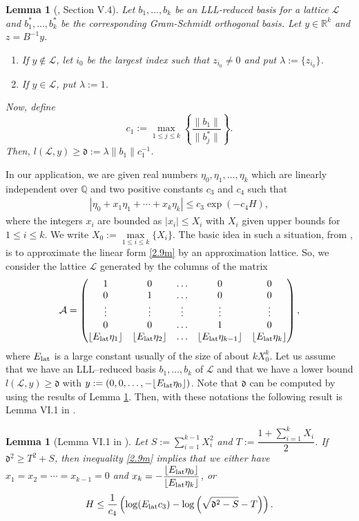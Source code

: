 \documentclass[11pt,a4paper]{article}
\newtheorem{lemma}[theorem]{Lemma}
\numberwithin{equation}{section}
\numberwithin{table}{section}
\numberwithin{figure}{section}
\begin{document}
\begin{lemma}[\cite{SMA}, Section V.4]\label{lem2.5m}
	Let $b_1, \dots, b_k$ be an LLL-reduced basis for a lattice $\mathcal{L}$ and $b_1^*, \dots, b_k^*$ be the corresponding Gram-Schmidt orthogonal basis. Let $y\in\mathbb{R}^k$ and $z=B^{-1}y$.
	\begin{enumerate}[\upshape(i)]
		\item If $y\not \in \mathcal{L}$, let $i_0$ be the largest index such that $z_{i_0}\ne 0$ and put $\lambda:=\{z_{i_0}\}$.
		\item If $y\in \mathcal{L}$, put $\lambda:=1$.
	\end{enumerate}
	Now, define
	\[
	c_1 := \max_{1\le j\le k}\left\{\dfrac{\|b_1\|}{\|b_j^*\|}\right\}.
	\]
	Then, $l(\mathcal{L}, y) \ge  \mathfrak{d} := \lambda\|b_1\|c_1^{-1}$.
\end{lemma}

In our application, we are given real numbers $\eta_0,\eta_1,\ldots,\eta_k$ which are linearly independent over $\mathbb{Q}$ and two positive constants $c_3$ and $c_4$ such that 
\begin{align}\label{2.9m}
	|\eta_0+x_1\eta_1+\cdots +x_k \eta_k|\le c_3 \exp(-c_4 H),
\end{align}
where the integers $x_i$ are bounded as $|x_i|\le X_i$ with $X_i$ given upper bounds for $1\le i\le k$. We write $X_0:=\max\limits_{1\le i\le k}\{X_i\}$. The basic idea in such a situation, from \cite{Weg}, is to approximate the linear form \eqref{2.9m} by an approximation lattice. So, we consider the lattice $\mathcal{L}$ generated by the columns of the matrix
$$ \mathcal{A}=\begin{pmatrix}
	1 & 0 &\ldots& 0 & 0 \\
	0 & 1 &\ldots& 0 & 0 \\
	\vdots & \vdots &\vdots& \vdots & \vdots \\
	0 & 0 &\ldots& 1 & 0 \\
	\lfloor E_{\rm lat}\eta_1\rfloor & \lfloor E_{\rm lat}\eta_2\rfloor&\ldots & \lfloor E_{\rm lat}\eta_{k-1}\rfloor& \lfloor E_{\rm lat}\eta_{k} \rfloor
\end{pmatrix} ,$$
where $E_{\rm lat}$ is a large constant usually of the size of about $kX_0^k$. Let us assume that we have an LLL--reduced basis $b_1,\ldots, b_k$ of $\mathcal{L}$ and that we have a lower bound $l\left(\mathcal{L},y\right)\ge \mathfrak{d}$ with $y:=(0,0,\ldots,-\lfloor E_{\rm lat}\eta_0\rfloor)$. Note that $ \mathfrak{d}$ can be computed by using the results of Lemma \ref{lem2.5m}. Then, with these notations the following result  is Lemma VI.1 in \cite{SMA}.
\begin{lemma}[Lemma VI.1 in \cite{SMA}]\label{lem2.6m}
	Let $S:=\displaystyle\sum_{i=1}^{k-1}X_i^2$ and $T:=\dfrac{1+\sum_{i=1}^{k}X_i}{2}$. If $\mathfrak{d}^2\ge T^2+S$, then inequality \eqref{2.9m} implies that we either have $x_1=x_2=\cdots=x_{k-1}=0$ and $x_k=-\dfrac{\lfloor E_{\rm lat}\eta_0 \rfloor}{\lfloor E_{\rm lat}\eta_k \rfloor}$, or
	\[
	H\le \dfrac{1}{c_4}\left(\log(E_{\rm lat}c_3)-\log\left(\sqrt{\mathfrak{d}^2-S}-T\right)\right).
	\]
\end{lemma}
\end{document}
